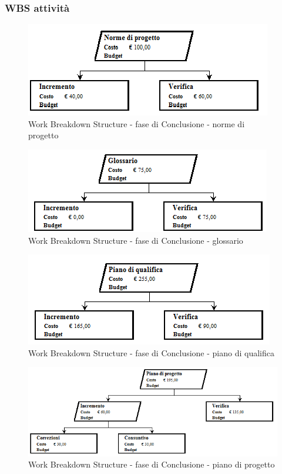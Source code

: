 \documentclass[a4paper]{article}
\begin{document}
			\subsubsection{WBS attività}
				\begin{figure}[H]
					\centering
					\includegraphics[width=\textwidth]{wbs/wbs_conclusione_1}
					\caption{Work Breakdown Structure - fase di Conclusione - norme di progetto}
				\end{figure}
				\begin{figure}[H]
					\centering
					\includegraphics[width=\textwidth]{wbs/wbs_conclusione_2}
					\caption{Work Breakdown Structure - fase di Conclusione - glossario}
				\end{figure}
				\begin{figure}[H]
					\centering
					\includegraphics[width=\textwidth]{wbs/wbs_conclusione_3}
					\caption{Work Breakdown Structure - fase di Conclusione - piano di qualifica}
				\end{figure}
				\begin{figure}[H]
					\centering
					\includegraphics[width=\textwidth]{wbs/wbs_conclusione_4}
					\caption{Work Breakdown Structure - fase di Conclusione - piano di progetto}
				\end{figure}
\end{document}

